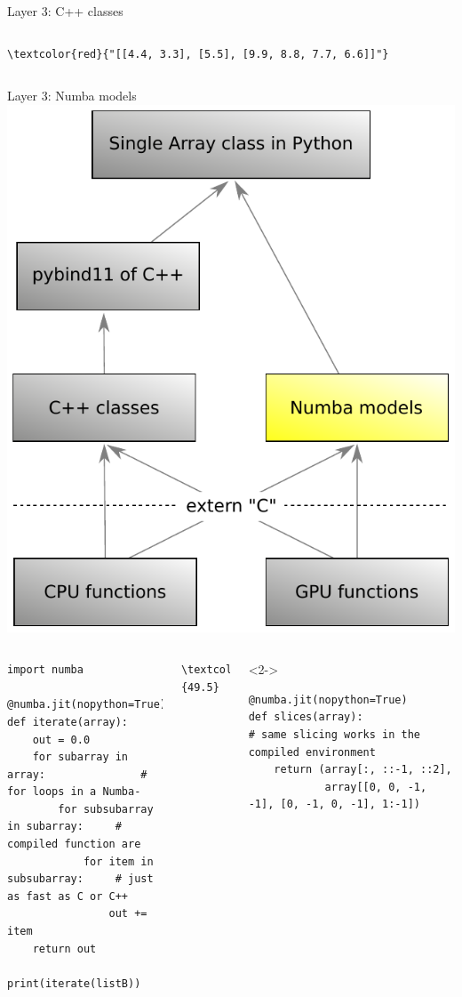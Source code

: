 \documentclass[aspectratio=169]{beamer}
\begin{document}
\begin{frame}[fragile]{Layer 3: C++ classes}
\begin{columns}
\begin{uncoverenv}
\vspace{-0.25 cm}
\begin{Verbatim}[commandchars=\\\{\}]
\textcolor{red}{"[[4.4, 3.3], [5.5], [9.9, 8.8, 7.7, 6.6]]"}
\end{Verbatim}
\end{uncoverenv}
\end{columns}
\vspace{1 cm}
\end{frame}

\begin{frame}[fragile]{Layer 3: Numba models}
\vspace{0.5 cm}
\hfill\mbox{\includegraphics[height=4 cm]{awkward-1-0-layers-mini-numba.pdf}\hspace{-0.75 cm}}

\scriptsize
\vspace{-4.45 cm}
\begin{columns}
\begin{verbatim}
import numba

@numba.jit(nopython=True)
def iterate(array):
    out = 0.0
    for subarray in array:               # for loops in a Numba-
        for subsubarray in subarray:     # compiled function are
            for item in subsubarray:     # just as fast as C or C++
                out += item
    return out

print(iterate(listB))
\end{verbatim}

\vspace{-0.25 cm}
\begin{Verbatim}[commandchars=\\\{\}]
\textcolor{red}{49.5}
\end{Verbatim}
\begin{uncoverenv}<2->
\begin{verbatim}
@numba.jit(nopython=True)
def slices(array):                       # same slicing works in the compiled environment
    return (array[:, ::-1, ::2],
            array[[0, 0, -1, -1], [0, -1, 0, -1], 1:-1])


\end{verbatim}
\end{uncoverenv}
\end{columns}
\end{frame}
\end{document}
